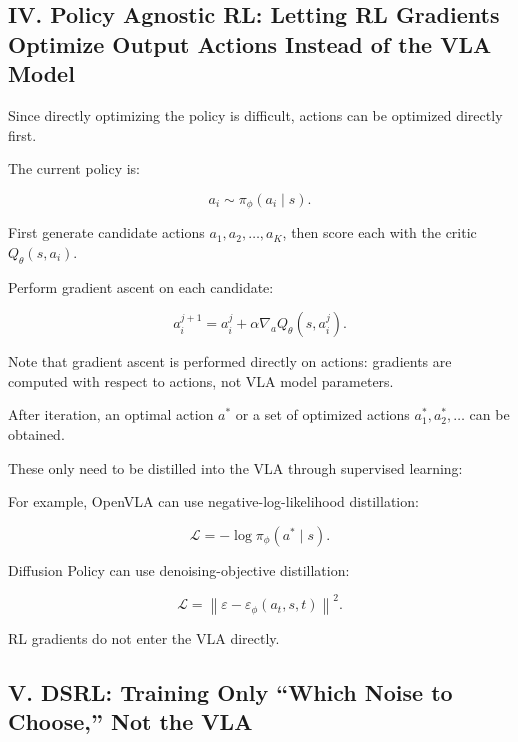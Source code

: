 \hypertarget{iv.-policy-agnostic-rl-letting-rl-gradients-optimize-output-actions-instead-of-the-vla-model}{%
\subsection{IV. Policy Agnostic RL: Letting RL Gradients Optimize Output Actions Instead of the VLA Model}\label{iv.-policy-agnostic-rl-letting-rl-gradients-optimize-output-actions-instead-of-the-vla-model}}

Since directly optimizing the policy is difficult, actions can be optimized directly first.

The current policy is:

\[
a_i\sim\pi_\phi(a_i\mid s).
\]

First generate candidate actions \(a_1,a_2,\ldots,a_K\), then score each with the critic \(Q_\theta(s,a_i)\).

Perform gradient ascent on each candidate:

\[
a_i^{j+1}=a_i^j+\alpha\nabla_a Q_\theta(s,a_i^j).
\]

Note that gradient ascent is performed directly on actions: gradients are computed with respect to actions, not VLA model parameters.

After iteration, an optimal action \(a^\ast\) or a set of optimized actions \(a_1^\ast,a_2^\ast,\ldots\) can be obtained.

These only need to be distilled into the VLA through supervised learning:

For example, OpenVLA can use negative-log-likelihood distillation:

\[
\mathcal{L}=-\log\pi_\phi(a^\ast\mid s).
\]

Diffusion Policy can use denoising-objective distillation:

\[
\mathcal{L}=\left\|\varepsilon-\varepsilon_\phi(a_t,s,t)\right\|^2.
\]

RL gradients do not enter the VLA directly.

\hypertarget{v.-dsrl-training-only-which-noise-to-choose-not-the-vla}{%
\subsection{V. DSRL: Training Only ``Which Noise to Choose,'' Not the VLA}\label{v.-dsrl-training-only-which-noise-to-choose-not-the-vla}}

